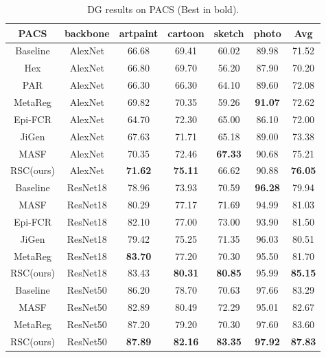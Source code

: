 \documentclass[runningheads]{llncs}
\begin{document}
\begin{table}[!htb]
\footnotesize
\centering \fontsize{7}{8}\selectfont
\begin{tabular}{c| c| c| c| c| c|| c } \hline PACS & backbone & artpaint & cartoon & sketch & photo & Avg  \\ [0.5ex] \hline\hline Baseline\cite{carlucci2019domain} & AlexNet & 66.68 & 69.41 & 60.02 & 89.98 & 71.52 \\ Hex\cite{wang2018learning} & AlexNet & 66.80 & 69.70 & 56.20 & 87.90 & 70.20 \\ PAR\cite{wang2019learning} & AlexNet & 66.30 & 66.30 & 64.10 & 89.60 & 72.08\\
MetaReg\cite{balaji2018metareg} & AlexNet & 69.82 & 70.35 & 59.26 & \textbf{91.07} & 72.62 \\ Epi-FCR\cite{li2019episodic} & AlexNet& 64.70 & 72.30 & 65.00 & 86.10 & 72.00  \\
JiGen\cite{carlucci2019domain} & AlexNet & 67.63 & 71.71 & 65.18 & 89.00 & 73.38 \\ MASF\cite{dou2019domain} & AlexNet & 70.35 & 72.46 & \textbf{67.33} & 90.68 & 75.21 \\ RSC(ours) & AlexNet & \textbf{71.62} & \textbf{75.11} & 66.62 & 90.88 & \textbf{76.05} \\ \hline Baseline\cite{carlucci2019domain} & ResNet18 & 78.96 & 73.93 & 70.59 & \textbf{96.28} & 79.94\\ MASF\cite{dou2019domain} & ResNet18 & 80.29 & 77.17 & 71.69& 94.99 & 81.03 \\ Epi-FCR\cite{li2019episodic} & ResNet18& 82.10 & 77.00 & 73.00 & 93.90 & 81.50  \\
JiGen\cite{carlucci2019domain} & ResNet18 & 79.42 & 75.25 & 71.35 & 96.03 & 80.51 \\ MetaReg\cite{balaji2018metareg} & ResNet18 & \textbf{83.70} & 77.20 & 70.30 & 95.50 & 81.70 \\ RSC(ours) & ResNet18 & 83.43 & \textbf{80.31}  & \textbf{80.85} & 95.99 & \textbf{85.15} \\ \hline Baseline\cite{carlucci2019domain} & ResNet50 & 86.20 & 78.70 & 70.63 & 97.66 & 83.29\\ MASF\cite{dou2019domain} & ResNet50 & 82.89 & 80.49 & 72.29& 95.01 & 82.67 \\ MetaReg\cite{balaji2018metareg} & ResNet50 & 87.20 & 79.20 & 70.30 & 97.60 & 83.60 \\ RSC(ours) & ResNet50 & \textbf{87.89} & \textbf{82.16} & \textbf{83.35} & \textbf{97.92}& \textbf{87.83}  \\ \hline 
\end{tabular}
\vspace{0.5em}
\caption{DG results on PACS\cite{li2017deeper} (Best in bold).} \vspace{-2em}
\label{table:PACS} \end{table}
\end{document}
